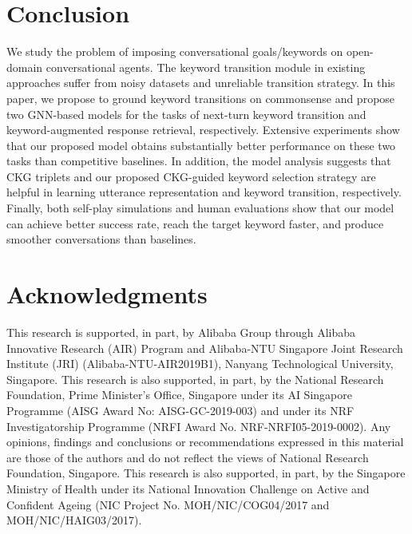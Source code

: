 \documentclass[letterpaper]{article} %
\begin{document}
\section{Conclusion}
\label{sec: conclusion}
We study the problem of imposing conversational goals/keywords on open-domain conversational agents. The keyword transition module in existing approaches suffer from noisy datasets and unreliable transition strategy. In this paper, we propose to ground keyword transitions on commonsense and propose two GNN-based models for the tasks of next-turn keyword transition and keyword-augmented response retrieval, respectively. Extensive experiments show that our proposed model obtains substantially better performance on these two tasks than competitive baselines. In addition, the model analysis suggests that CKG triplets and our proposed CKG-guided keyword selection strategy are helpful in learning utterance representation and keyword transition, respectively. Finally, both self-play simulations and human evaluations show that our model can achieve better success rate, reach the target keyword faster, and produce smoother conversations than baselines.

\section*{Acknowledgments}
This research is supported, in part, by Alibaba Group through Alibaba Innovative Research (AIR) Program and Alibaba-NTU Singapore Joint Research Institute (JRI) (Alibaba-NTU-AIR2019B1), Nanyang Technological University, Singapore. This research is also supported, in part, by the National Research Foundation, Prime Minister's Office, Singapore under its AI Singapore Programme (AISG Award No: AISG-GC-2019-003) and under its NRF Investigatorship Programme (NRFI Award No. NRF-NRFI05-2019-0002). Any opinions, findings and conclusions or recommendations expressed in this material are those of the authors and do not reflect the views of National Research Foundation, Singapore. This research is also supported, in part, by the Singapore Ministry of Health under its National Innovation Challenge on Active and Confident Ageing (NIC Project No. MOH/NIC/COG04/2017 and MOH/NIC/HAIG03/2017).


\end{document}
